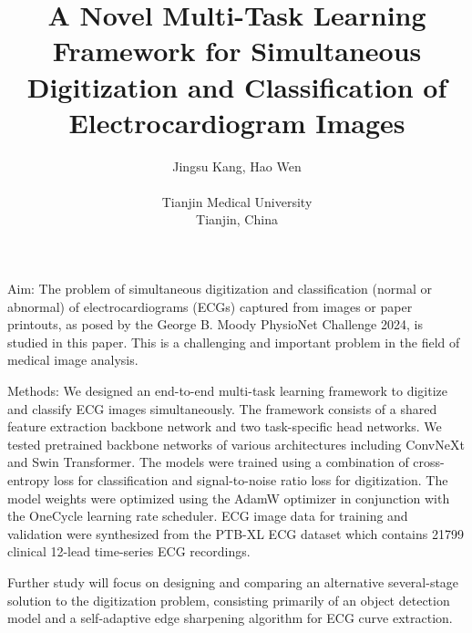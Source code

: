 \documentclass{cinc-abstract}
\begin{document}
\title{A Novel Multi-Task Learning Framework for Simultaneous Digitization and Classification of Electrocardiogram Images}

\author {Jingsu Kang, Hao Wen\\ %
\ \\ %
Tianjin Medical University\\  %
Tianjin, China} %

\maketitle



Aim: The problem of simultaneous digitization and classification (normal or abnormal) of electrocardiograms (ECGs) captured from images or paper printouts, as posed by the George B. Moody PhysioNet Challenge 2024, is studied in this paper. This is a challenging and important problem in the field of medical image analysis.

Methods: We designed an end-to-end multi-task learning framework to digitize and classify ECG images simultaneously. The framework consists of a shared feature extraction backbone network and two task-specific head networks. We tested pretrained backbone networks of various architectures including ConvNeXt and Swin Transformer. The models were trained using a combination of cross-entropy loss for classification and signal-to-noise ratio loss for digitization. The model weights were optimized using the AdamW optimizer in conjunction with the OneCycle learning rate scheduler. ECG image data for training and validation were synthesized from the PTB-XL ECG dataset which contains 21799 clinical 12-lead time-series ECG recordings.

Further study will focus on designing and comparing an alternative several-stage solution to the digitization problem, consisting primarily of an object detection model and a self-adaptive edge sharpening algorithm for ECG curve extraction.
\end{document}
